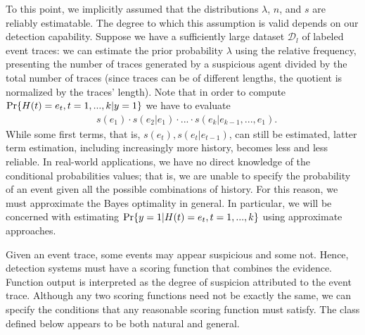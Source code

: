 To this point, we implicitly assumed that the distributions $\lambda$, $n$, and $s$ are reliably estimatable. The degree to which this assumption is valid depends on our detection capability.
%
Suppose we have a sufficiently large dataset $\mathcal{D}_l$ of labeled event traces: we can estimate the prior probability $\lambda$  using the relative frequency, presenting the number of traces generated by a suspicious agent divided by the total number of traces (since traces can be of different lengths, the quotient is normalized by the traces' length).
%
%
Note that in order to compute $\text{Pr}\{H(t)=e_t, t=1,...,k|y=1\}$ we have to evaluate
\begin{eqnarray}
\label{eq:bayes-opt}
	&s(e_1) \cdot s(e_{2}|e_1) \cdot ... \cdot s(e_k|e_{k-1},...,e_1).
\end{eqnarray}
While some first terms, that is, $s(e_t), s(e_t|e_{t-1})$, can still be estimated, latter term estimation, including increasingly more history, becomes less and less reliable. In real-world applications, we have no direct knowledge of the conditional probabilities values; that is, we are unable to specify the probability of an event given all the possible combinations of history. For this reason, we must approximate the Bayes optimality in general. In particular, we will be concerned with estimating $\text{Pr}\{y=1|H(t)=e_t, t=1,...,k\}$ using approximate approaches.





Given an event trace, some events may appear suspicious and some not. Hence, detection systems must have a scoring function that combines the evidence. Function output is interpreted as the degree of suspicion attributed to the event trace. Although any two scoring functions need not be exactly the same, we can specify the conditions that any reasonable scoring function must satisfy.  The class defined below appears to be both natural and general.

